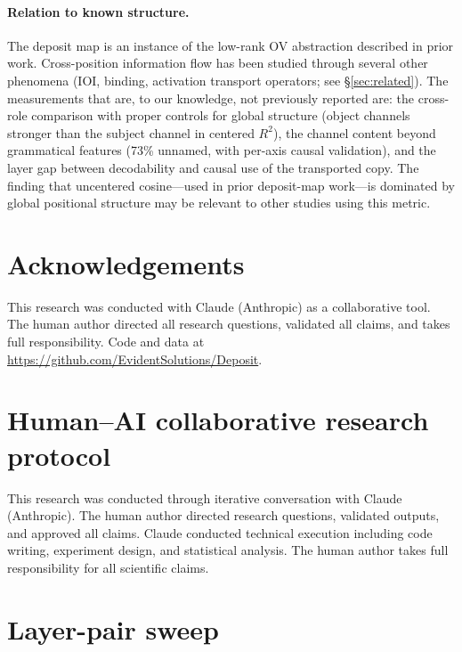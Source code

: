 \documentclass[11pt,a4paper]{article}
\begin{document}
\paragraph{Relation to known structure.}
The deposit map is an instance of the low-rank OV abstraction described in prior work.
Cross-position information flow has been studied through several other phenomena (IOI,
binding, activation transport operators; see \S\ref{sec:related}). The measurements that
are, to our knowledge, not previously reported are: the cross-role comparison with proper
controls for global structure (object channels stronger than the subject channel in centered
$R^2$), the channel content beyond grammatical features (73\% unnamed, with per-axis causal
validation), and the layer gap between decodability and causal use of the transported copy.
The finding that uncentered cosine---used in prior deposit-map work---is dominated by global
positional structure may be relevant to other studies using this metric.

\section*{Acknowledgements}

This research was conducted with Claude (Anthropic) as a collaborative tool.
The human author directed all research questions, validated all claims, and
takes full responsibility. Code and data at
\url{https://github.com/EvidentSolutions/Deposit}.

\appendix
\section{Human--AI collaborative research protocol}
\label{sec:protocol}

This research was conducted through iterative conversation with Claude
(Anthropic). The human author directed research questions, validated outputs,
and approved all claims. Claude conducted technical execution including code
writing, experiment design, and statistical analysis. The human author takes
full responsibility for all scientific claims.

\section{Layer-pair sweep}
\label{sec:layer-sweep-appendix}
\end{document}

